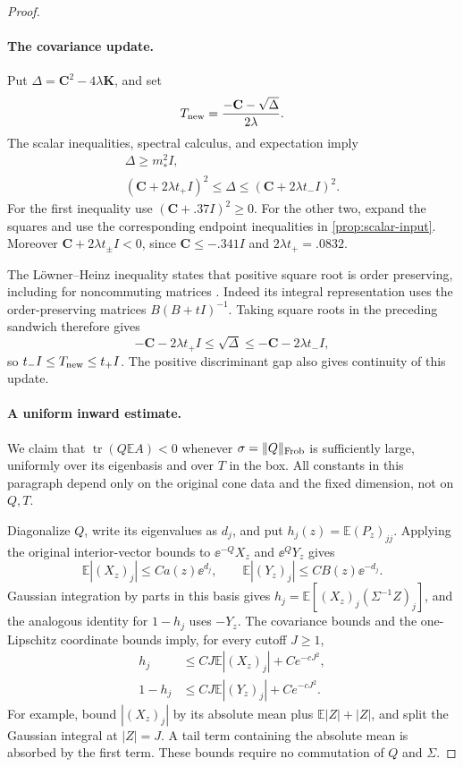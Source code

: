 \begin{proof}
\paragraph{The covariance update.}
Put $\Delta=\mathbf{C}^2-4\lambda\mathbf{K}$, and set
\[
T_{\rm new}=\frac{-\mathbf{C}-\sqrt\Delta}{2\lambda}.
\]
The scalar inequalities, spectral calculus, and expectation imply
\[
\begin{gathered}
\Delta\ge m_*^2I,\\
(\mathbf{C}+2\lambda t_+I)^2\le\Delta
\le(\mathbf{C}+2\lambda t_-I)^2.
\end{gathered}
\]
For the first inequality use $(\mathbf{C}+.37I)^2\ge0$. For the other two, expand the squares and use the corresponding endpoint inequalities in \cref{prop:scalar-input}. Moreover $\mathbf{C}+2\lambda t_\pm I<0$, since $\mathbf{C}\le-.341I$ and $2\lambda t_+=.0832$.

The L\"owner--Heinz inequality states that positive square root is order preserving, including for noncommuting matrices \cite[Theorem~2.3]{Chansangiam2013}. Indeed its integral representation uses the order-preserving matrices $B(B+tI)^{-1}$. Taking square roots in the preceding sandwich therefore gives
\[
-\mathbf{C}-2\lambda t_+I\le\sqrt\Delta
\le-\mathbf{C}-2\lambda t_-I,
\]
so $t_-I\le T_{\rm new}\le t_+I$. The positive discriminant gap also gives continuity of this update.

\paragraph{A uniform inward estimate.}
We claim that $\operatorname{tr}(Q\mathbb{E}A)<0$ whenever $\sigma=\|Q\|_{\rm Frob}$ is sufficiently large, uniformly over its eigenbasis and over $T$ in the box. All constants in this paragraph depend only on the original cone data and the fixed dimension, not on $Q,T$.

Diagonalize $Q$, write its eigenvalues as $d_j$, and put $h_j(z)=\mathbb{E}(P_z)_{jj}$. Applying the original interior-vector bounds to $\ee^{-Q}X_z$ and $\ee^QY_z$ gives
\[
\mathbb{E}|(X_z)_j|\le Ca(z)\ee^{d_j},\qquad
\mathbb{E}|(Y_z)_j|\le CB(z)\ee^{-d_j}.
\]
Gaussian integration by parts in this basis gives $h_j=\mathbb{E}[(X_z)_j(\Sigma^{-1}Z)_j]$, and the analogous identity for $1-h_j$ uses $-Y_z$. The covariance bounds and the one-Lipschitz coordinate bounds imply, for every cutoff $J\ge1$,
\[
\begin{aligned}
h_j&\le CJ\mathbb{E}|(X_z)_j|+Ce^{-cJ^2},\\
1-h_j&\le CJ\mathbb{E}|(Y_z)_j|+Ce^{-cJ^2}.
\end{aligned}
\]
For example, bound $|(X_z)_j|$ by its absolute mean plus $\mathbb{E}|Z|+|Z|$, and split the Gaussian integral at $|Z|=J$. A tail term containing the absolute mean is absorbed by the first term. These bounds require no commutation of $Q$ and $\Sigma$.


\end{proof}
